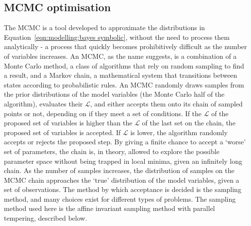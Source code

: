 \subsection{MCMC optimisation}
The MCMC is a tool developed to approximate the distributions in Equation~\ref{eqn:modelling:bayes symbolic}, without the need to process them analytically - a process that quickly becomes prohibitively difficult as the number of variables increases.
An MCMC, as the name suggests, is a combination of a Monte Carlo method, a class of algorithms that rely on random sampling to find a result, and a Markov chain, a mathematical system that transitions between states according to probabilistic rules. An MCMC randomly draws samples from the prior distributions of the model variables (the Monte Carlo half of the algorithm), evaluates their $\mathcal{L}$, and either accepts them onto its chain of sampled points or not, depending on if they meet a set of conditions. If the $\mathcal{L}$ of the proposed set of variables is higher than the $\mathcal{L}$ of the last set on the chain, the proposed set of variables is accepted. If $\mathcal{L}$ is lower, the algorithm randomly accepts or rejects the proposed step. By giving a finite chance to accept a `worse' set of parameters, the chain is, in theory, allowed to explore the possible parameter space without being trapped in local minima, given an infinitely long chain.
As the number of samples increases, the distribution of samples on the MCMC chain approaches the `true' distribution of the model variables, given a set of observations.
The method by which acceptance is decided is the sampling method, and many choices exist for different types of problems. The sampling method used here is the affine invariant sampling method with parallel tempering, described below.



